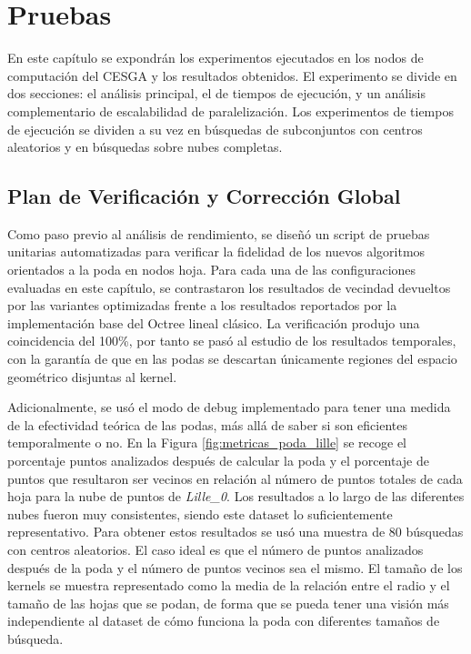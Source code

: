 \chapter{Pruebas}
En este capítulo se expondrán los experimentos ejecutados en los nodos de computación del CESGA y los resultados obtenidos. El experimento se divide en dos secciones: el análisis principal, el de tiempos de ejecución, y un análisis complementario de escalabilidad de paralelización. Los experimentos de tiempos de ejecución se dividen a su vez en búsquedas de subconjuntos con centros aleatorios y en búsquedas sobre nubes completas.

\section{Plan de Verificación y Corrección Global}
Como paso previo al análisis de rendimiento, se diseñó un script de pruebas unitarias automatizadas para verificar la fidelidad de los nuevos algoritmos orientados a la poda en nodos hoja. Para cada una de las configuraciones evaluadas en este capítulo, se contrastaron los resultados de vecindad devueltos por las variantes optimizadas frente a los resultados reportados por la implementación base del Octree lineal clásico. La verificación produjo una coincidencia del 100\%, por tanto se pasó al estudio de los resultados temporales, con la garantía de que en las podas se descartan únicamente regiones del espacio geométrico disjuntas al kernel.

Adicionalmente, se usó el modo de debug implementado para tener una medida de la efectividad teórica de las podas, más allá de saber si son eficientes temporalmente o no. En la Figura \ref{fig:metricas_poda_lille} se recoge el porcentaje puntos analizados después de calcular la poda y el porcentaje de puntos que resultaron ser vecinos en relación al número de puntos totales de cada hoja para la nube de puntos de \textit{Lille\_0}. Los resultados a lo largo de las diferentes nubes fueron muy consistentes, siendo este dataset lo suficientemente representativo. Para obtener estos resultados se usó una muestra de 80 búsquedas con centros aleatorios. El caso ideal es que el número de puntos analizados después de la poda y el número de puntos vecinos sea el mismo. El tamaño de los kernels se muestra representado como la media de la relación entre el radio y el tamaño de las hojas que se podan, de forma que se pueda tener una visión más independiente al dataset de cómo funciona la poda con diferentes tamaños de búsqueda. 

